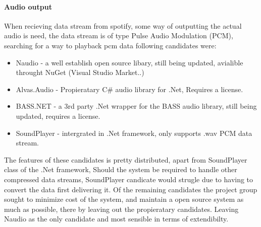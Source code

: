 	\paragraph{Audio output}
	When recieving data stream from spotify, some way of outputting the actual audio is need, the data stream is of type Pulse Audio Modulation (PCM), searching for a way to playback pcm data following candidates were:

\begin{itemize}
	\item Naudio \cite{naudio} - a well establish open source libary, still being updated, avialible throught NuGet (Visual Studio Market..)
	\item Alvas.Audio \cite{alvas} - Propieratary C\# audio library for .Net, Requires a license.
	\item BASS.NET \cite{bass} - a 3rd party .Net wrapper for the BASS audio library, still being updated, requires a license.
	\item SoundPlayer - intergrated in .Net framework, only supports .wav PCM data stream.
\end{itemize}

	The features of these candidates is pretty distributed, apart from SoundPlayer class of the .Net framework, Should the system be required to handle other compressed data streams, SoundPlayer candicate would strugle due to having to convert the data first delivering it. Of the remaining candidates the project group sought to minimize cost of the system, and maintain a open source system as much as possible, there by leaving out the propieratary candidates. Leaving Naudio as the only candidate and most sensible in terms of extendibilty.